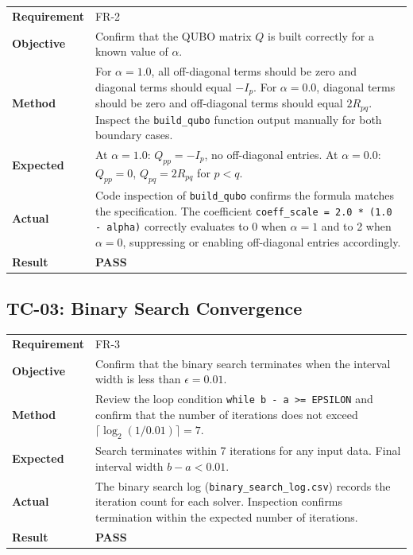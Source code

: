 \documentclass[12pt,a4paper]{article}
\newcommand{\pass}{\textcolor{green!50!black}{\textbf{PASS}}}
\begin{document}
\begin{table}[h!]
\renewcommand{\arraystretch}{1.3}
\begin{tabular}{@{}lp{10cm}@{}}
\toprule
\textbf{Requirement} & FR-2 \\
\textbf{Objective} & Confirm that the QUBO matrix $Q$ is built correctly
    for a known value of $\alpha$. \\
\textbf{Method} & For $\alpha = 1.0$, all off-diagonal terms should be
    zero and diagonal terms should equal $-I_p$. For $\alpha = 0.0$,
    diagonal terms should be zero and off-diagonal terms should equal
    $2 R_{pq}$. Inspect the \texttt{build\_qubo} function output
    manually for both boundary cases. \\
\textbf{Expected} & At $\alpha = 1.0$: $Q_{pp} = -I_p$, no off-diagonal
    entries. At $\alpha = 0.0$: $Q_{pp} = 0$,
    $Q_{pq} = 2 R_{pq}$ for $p < q$. \\
\textbf{Actual} & Code inspection of \texttt{build\_qubo} confirms
    the formula matches the specification. The coefficient
    \texttt{coeff\_scale = 2.0 * (1.0 - alpha)} correctly evaluates to 0
    when $\alpha = 1$ and to 2 when $\alpha = 0$, suppressing or enabling
    off-diagonal entries accordingly. \\
\textbf{Result} & \pass \\
\bottomrule
\end{tabular}
\end{table}

\subsection{TC-03: Binary Search Convergence}

\begin{table}[h!]
\renewcommand{\arraystretch}{1.3}
\begin{tabular}{@{}lp{10cm}@{}}
\toprule
\textbf{Requirement} & FR-3 \\
\textbf{Objective} & Confirm that the binary search terminates when the
    interval width is less than $\epsilon = 0.01$. \\
\textbf{Method} & Review the loop condition \texttt{while b - a >= EPSILON}
    and confirm that the number of iterations does not exceed
    $\lceil \log_2(1/0.01) \rceil = 7$. \\
\textbf{Expected} & Search terminates within 7 iterations for any
    input data. Final interval width $b - a < 0.01$. \\
\textbf{Actual} & The binary search log (\texttt{binary\_search\_log.csv})
    records the iteration count for each solver. Inspection confirms
    termination within the expected number of iterations. \\
\textbf{Result} & \pass \\
\bottomrule
\end{tabular}
\end{table}
\end{document}
